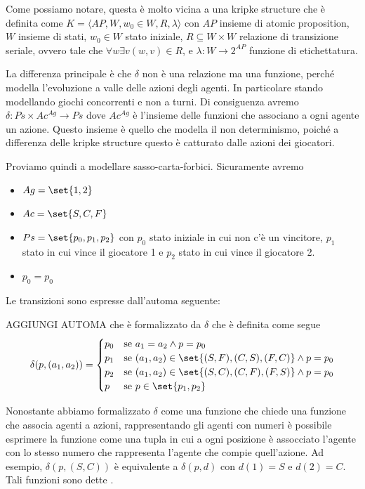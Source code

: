 Come possiamo notare, questa è molto vicina a una kripke structure che è definita come \(K=\langle AP,W,w_0 \in W,R,\lambda\rangle\) con \(AP\) insieme di atomic proposition, \(W\) insieme di stati, \(w_0 \in W\) stato iniziale, \(R \subseteq W\times W\) relazione di transizione seriale, ovvero tale che \(\forall w\exists v (w,v) \in R\), e \(\lambda: W \to 2^{AP}\) funzione di etichettatura.

La differenza principale è che \(\delta\) non è una relazione ma una funzione, perché modella l'evoluzione a valle delle azioni degli agenti. In particolare stando modellando giochi concorrenti e non a turni. Di consiguenza avremo \(\delta: Ps \times Ac^{Ag} \to Ps\) dove \(Ac^{Ag}\) è l'insieme delle funzioni che associano a ogni agente un azione. Questo insieme è quello che modella il non determinismo, poiché a differenza delle kripke structure questo è catturato dalle azioni dei giocatori.

Proviamo quindi a modellare sasso-carta-forbici. Sicuramente avremo
\begin{itemize}
  \item \(Ag = \set{1,2}\)
  \item \(Ac = \set{S,C,F}\)
  \item \(Ps = \set{p_0, p_1, p_2}\) con \(p_0\) stato iniziale in cui non c'è un vincitore, \(p_1\) stato in cui vince il giocatore 1 e \(p_2\) stato in cui vince il giocatore 2.
  \item \(p_0 = p_0\)
\end{itemize}

Le transizioni sono espresse dall'automa seguente:

AGGIUNGI AUTOMA
che è formalizzato da \(\delta\) che è definita come segue
\[\delta(p,(a_1,a_2)) = \begin{cases}
                          p_0 & \text{se } a_1 = a_2 \land p = p_0 \\
                          p_1 & \text{se } (a_1,a_2) \in \set{(S,F),(C,S),(F,C)} \land p = p_0 \\
                          p_2 & \text{se } (a_1,a_2) \in \set{(S,C),(C,F),(F,S)} \land p = p_0 \\
                          p & \text{se } p \in \set{p_1,p_2}
                        \end{cases}\]

\begin{note}
  Nonostante abbiamo formalizzato \(\delta\) come una funzione che chiede una funzione che associa agenti a azioni, rappresentando gli agenti con numeri è possibile esprimere la funzione come una tupla in cui a ogni posizione è assocciato l'agente con lo stesso numero che rappresenta l'agente che compie quell'azione. Ad esempio, \(\delta(p,(S,C))\) è equivalente a \(\delta(p, d)\) con \(d(1) = S\) e \(d(2) = C\). Tali funzioni sono dette .
\end{note}

